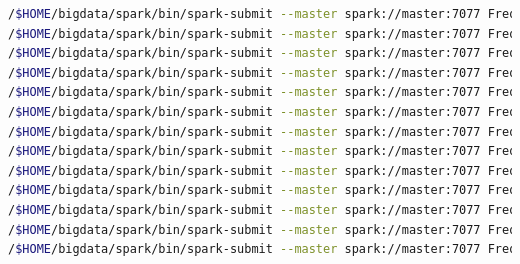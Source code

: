 \begin{lstlisting}[label=sfreqdaydis,language=sh,frame=single,caption=Script rutas más frecuentes con estacionalidad en modo distribuido]
/$HOME/bigdata/spark/bin/spark-submit --master spark://master:7077 FrequentRoutesDay.py mil.parquet martes 01-01 11:00
/$HOME/bigdata/spark/bin/spark-submit --master spark://master:7077 FrequentRoutesDay.py quinientos.parquet martes 01-01 11:00
/$HOME/bigdata/spark/bin/spark-submit --master spark://master:7077 FrequentRoutesDay.py cinquenta.parquet martes 01-01 11:00
/$HOME/bigdata/spark/bin/spark-submit --master spark://master:7077 FrequentRoutesDay.py 1decimo.parquet martes 01-01 11:00
/$HOME/bigdata/spark/bin/spark-submit --master spark://master:7077 FrequentRoutesDay.py 2decimo.parquet martes 01-01 11:00
/$HOME/bigdata/spark/bin/spark-submit --master spark://master:7077 FrequentRoutesDay.py 3decimo.parquet martes 01-01 11:00
/$HOME/bigdata/spark/bin/spark-submit --master spark://master:7077 FrequentRoutesDay.py 4decimo.parquet martes 01-01 11:00
/$HOME/bigdata/spark/bin/spark-submit --master spark://master:7077 FrequentRoutesDay.py half.parquet martes 01-01 11:00
/$HOME/bigdata/spark/bin/spark-submit --master spark://master:7077 FrequentRoutesDay.py 6decimo.parquet martes 01-01 11:00
/$HOME/bigdata/spark/bin/spark-submit --master spark://master:7077 FrequentRoutesDay.py 7decimo.parquet martes 01-01 11:00
/$HOME/bigdata/spark/bin/spark-submit --master spark://master:7077 FrequentRoutesDay.py 8decimo.parquet martes 01-01 11:00
/$HOME/bigdata/spark/bin/spark-submit --master spark://master:7077 FrequentRoutesDay.py 9decimo.parquet martes 01-01 11:00
/$HOME/bigdata/spark/bin/spark-submit --master spark://master:7077 FrequentRoutesDay.py full.parquet martes 01-01 11:00
\end{lstlisting}

